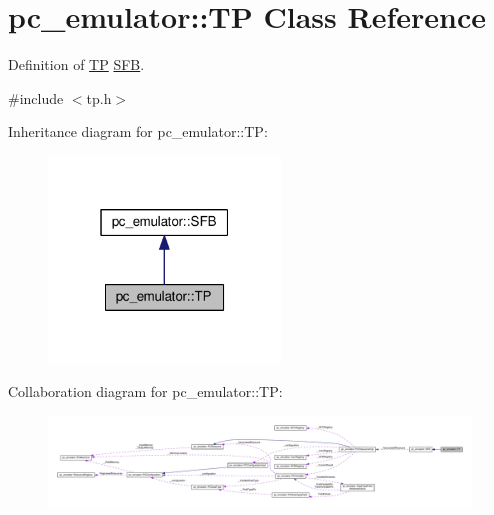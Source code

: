 \hypertarget{classpc__emulator_1_1TP}{}\section{pc\+\_\+emulator\+:\+:TP Class Reference}
\label{classpc__emulator_1_1TP}


Definition of \hyperlink{classpc__emulator_1_1TP}{TP} \hyperlink{classpc__emulator_1_1SFB}{S\+FB}.  




{\ttfamily \#include $<$tp.\+h$>$}



Inheritance diagram for pc\+\_\+emulator\+:\+:TP\+:
\nopagebreak
\begin{figure}[H]
\begin{center}
\leavevmode
\includegraphics[width=175pt]{classpc__emulator_1_1TP__inherit__graph}
\end{center}
\end{figure}


Collaboration diagram for pc\+\_\+emulator\+:\+:TP\+:
\nopagebreak
\begin{figure}[H]
\begin{center}
\leavevmode
\includegraphics[width=350pt]{classpc__emulator_1_1TP__coll__graph}
\end{center}
\end{figure}

